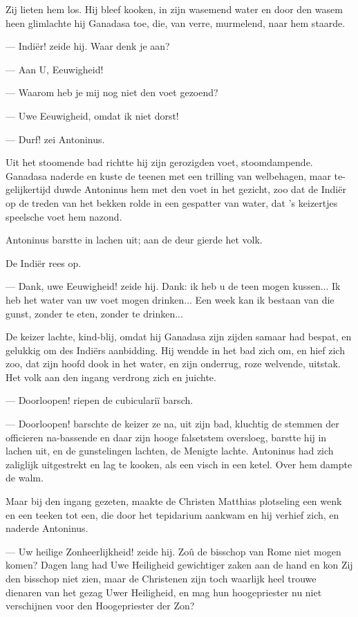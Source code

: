 \documentclass[a4paper, 12pt, oneside, dutch]{article}
\begin{document}
Zij lieten hem los. Hij bleef kooken, in zijn wasemend water en door den wasem heen glimlachte hij Ganadasa toe, die, van verre, murmelend, naar hem staarde.

--- Indiër! zeide hij. Waar denk je aan?

--- Aan U, Eeuwigheid!

--- Waarom heb je mij nog niet den voet gezoend?

--- Uwe Eeuwigheid, omdat ik niet dorst!

--- Durf! zei Antoninus.

Uit het stoomende bad richtte hij zijn gerozigden voet, stoomdampende. Ganadasa naderde en kuste de teenen met een trilling van welbehagen, maar te-gelijkertijd duwde Antoninus hem met den voet in het gezicht, zoo dat de Indiër op de treden van het bekken rolde in een gespatter van water, dat 's keizertjes speelsche voet hem nazond.

Antoninus barstte in lachen uit; aan de deur gierde het volk.

De Indiër rees op.

--- Dank, uwe Eeuwigheid! zeide hij. Dank: ik heb u de teen mogen kussen... Ik heb het water van uw voet mogen drinken... Een week kan ik bestaan van die gunst, zonder te eten, zonder te drinken...

De keizer lachte, kind-blij, omdat hij Ganadasa zijn zijden samaar had bespat, en gelukkig om des Indiërs aanbidding. Hij wendde in het bad zich om, en hief zich zoo, dat zijn hoofd dook in het water, en zijn onderrug, roze welvende, uitstak. Het volk aan den ingang verdrong zich en juichte.

--- Doorloopen! riepen de cubiculariï barsch.

--- Doorloopen! barschte de keizer ze na, uit zijn bad, kluchtig de stemmen der officieren na-bassende en daar zijn hooge falsetstem oversloeg, barstte hij in lachen uit, en de gunstelingen lachten, de Menigte lachte. Antoninus had zich zaliglijk uitgestrekt en lag te kooken, als een visch in een ketel. Over hem dampte de walm.

Maar bij den ingang gezeten, maakte de Christen Matthias plotseling een wenk en een teeken tot een, die door het tepidarium aankwam en hij verhief zich, en naderde Antoninus.

--- Uw heilige Zonheerlijkheid! zeide hij. Zoû de bisschop van Rome niet mogen komen? Dagen lang had Uwe Heiligheid gewichtiger zaken aan de hand en kon Zij den bisschop niet zien, maar de Christenen zijn toch waarlijk heel trouwe dienaren van het gezag Uwer Heiligheid, en mag hun hoogepriester nu niet verschijnen voor den Hoogepriester der Zon?
\end{document}
